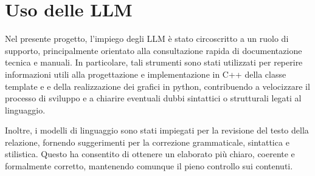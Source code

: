 \chapter{Uso delle LLM}

Nel presente progetto, l’impiego degli LLM è stato circoscritto a un ruolo di supporto, principalmente orientato alla consultazione rapida di documentazione 
tecnica e manuali. In particolare, tali strumenti sono stati utilizzati per reperire informazioni utili alla progettazione e implementazione in C++ 
della classe template e e della realizzazione dei grafici in python, contribuendo a velocizzare il processo di sviluppo e a chiarire eventuali 
dubbi sintattici o strutturali legati al linguaggio.

Inoltre, i modelli di linguaggio sono stati impiegati per la revisione del testo della relazione, fornendo suggerimenti per la correzione grammaticale, 
sintattica e stilistica. Questo ha consentito di ottenere un elaborato più chiaro, coerente e formalmente corretto, mantenendo comunque 
il pieno controllo sui contenuti.